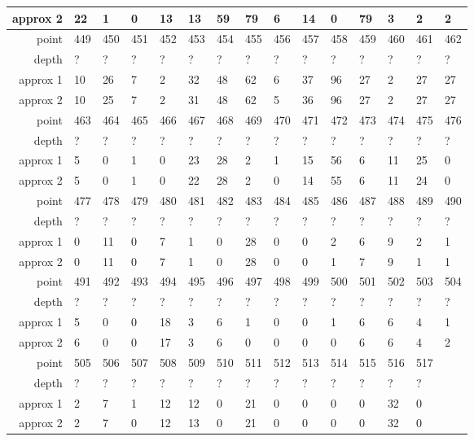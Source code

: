 \begin{center}
\begin{supertabular}{|r|l l l l l l l l l l l l l l|}
approx 2 & 22 & 1 & 0 & 13 & 13 & 59 & 79 & 6 & 14 & 0 & 79 & 3 & 2 & 2 \\
\hline
point & 449 & 450 & 451 & 452 & 453 & 454 & 455 & 456 & 457 & 458 & 459 & 460 & 461 & 462 \\
\hline
depth & ? & ? & ? & ? & ? & ? & ? & ? & ? & ? & ? & ? & ? & ? \\
approx 1 & 10 & 26 & 7 & 2 & 32 & 48 & 62 & 6 & 37 & 96 & 27 & 2 & 27 & 27 \\
approx 2 & 10 & 25 & 7 & 2 & 31 & 48 & 62 & 5 & 36 & 96 & 27 & 2 & 27 & 27 \\
\hline
point & 463 & 464 & 465 & 466 & 467 & 468 & 469 & 470 & 471 & 472 & 473 & 474 & 475 & 476 \\
\hline
depth & ? & ? & ? & ? & ? & ? & ? & ? & ? & ? & ? & ? & ? & ? \\
approx 1 & 5 & 0 & 1 & 0 & 23 & 28 & 2 & 1 & 15 & 56 & 6 & 11 & 25 & 0 \\
approx 2 & 5 & 0 & 1 & 0 & 22 & 28 & 2 & 0 & 14 & 55 & 6 & 11 & 24 & 0 \\
\hline
point & 477 & 478 & 479 & 480 & 481 & 482 & 483 & 484 & 485 & 486 & 487 & 488 & 489 & 490 \\
\hline
depth & ? & ? & ? & ? & ? & ? & ? & ? & ? & ? & ? & ? & ? & ? \\
approx 1 & 0 & 11 & 0 & 7 & 1 & 0 & 28 & 0 & 0 & 2 & 6 & 9 & 2 & 1 \\
approx 2 & 0 & 11 & 0 & 7 & 1 & 0 & 28 & 0 & 0 & 1 & 7 & 9 & 1 & 1 \\
\hline
point & 491 & 492 & 493 & 494 & 495 & 496 & 497 & 498 & 499 & 500 & 501 & 502 & 503 & 504 \\
\hline
depth & ? & ? & ? & ? & ? & ? & ? & ? & ? & ? & ? & ? & ? & ? \\
approx 1 & 5 & 0 & 0 & 18 & 3 & 6 & 1 & 0 & 0 & 1 & 6 & 6 & 4 & 1 \\
approx 2 & 6 & 0 & 0 & 17 & 3 & 6 & 0 & 0 & 0 & 0 & 6 & 6 & 4 & 2 \\
\hline
point & 505 & 506 & 507 & 508 & 509 & 510 & 511 & 512 & 513 & 514 & 515 & 516 & 517 & \\
\hline
depth & ? & ? & ? & ? & ? & ? & ? & ? & ? & ? & ? & ? & ? & \\
approx 1 & 2 & 7 & 1 & 12 & 12 & 0 & 21 & 0 & 0 & 0 & 0 & 32 & 0 & \\
approx 2 & 2 & 7 & 0 & 12 & 13 & 0 & 21 & 0 & 0 & 0 & 0 & 32 & 0 & \\
\hline
  \end{supertabular}
  \label{tab:test.forest4d}
\end{center}

